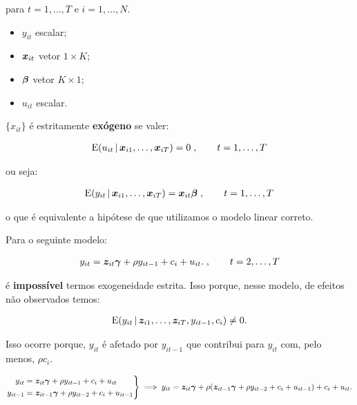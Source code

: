 \documentclass[11pt, oneside, a4paper, article]{article}
\numberwithin{equation}{section}
\begin{document}
\begin{description}
\begin{description}
\noindent
para
$t = 1, \dots, T$ e $i = 1, \dots, N$.

\begin{itemize}\itemsep0pt
\item
$y_{it}$ escalar;

\item
$\boldsymbol{x}_{it}$  vetor $1 \times K$;

\item
$\boldsymbol{\beta}$ vetor $K \times 1$;

\item
$u_{it}$ escalar.
\end{itemize}

\noindent
$\{x_{it}\}$ é estritamente \textbf{exógeno} se valer:

\vspace{-1 em}
\begin{align*}
	\text{E}( u_{it} \, | \, \boldsymbol{x}_{i1}, \dots, \boldsymbol{x}_{iT} ) = 0 \; , \qquad t = 1, \dots, T
\end{align*}

\noindent
ou seja:

\vspace{-1 em}
\begin{align*}
\text{E}( y_{it} \, | \, \boldsymbol{x}_{i1}, \dots, \boldsymbol{x}_{iT} ) = \boldsymbol{x}_{it} \boldsymbol{\beta} 
\; , \qquad t = 1, \dots, T
\end{align*}

\noindent
o que é equivalente a hipótese de que utilizamos o modelo linear correto.

Para o seguinte modelo:

\vspace{-1.5 em}
\begin{align*}
y_{it} = \boldsymbol{z}_{it} \boldsymbol{\gamma} + \rho y_{i t - 1} + c_{i} + u_{it}.
\; , \qquad t = 2, \dots, T
\end{align*}

\noindent
é \textbf{impossível} termos exogeneidade estrita.
Isso porque, nesse modelo, de efeitos não observados temos:

\vspace{-1.5 em}
\begin{align*}
	\text{E}( y_{it} \, | \, \boldsymbol{z}_{i1}, \dots, \boldsymbol{z}_{iT}, y_{it-1}, c_{i}) \neq 0.
\end{align*}

\noindent
Isso ocorre porque, $y_{it}$ é afetado por $y_{it-1}$ que contribui para $y_{it}$ com, pelo menos, $\rho c_{i}$.

\begin{equation*}
\left.
\begin{aligned}
y_{it} &= \boldsymbol{z}_{it} \boldsymbol{\gamma} + \rho y_{i t - 1} + c_{i} + u_{it}
\\
y_{it-1} &= \boldsymbol{z}_{it-1} \boldsymbol{\gamma} + \rho y_{i t - 2} + c_{i} + u_{it-1}
\end{aligned}
\right\} 
\implies
y_{it} = \boldsymbol{z}_{it} \boldsymbol{\gamma} +
\rho (\boldsymbol{z}_{it-1} \boldsymbol{\gamma} + \rho y_{i t - 2} + c_{i} + u_{it-1})
+ c_{i} + u_{it}.
\end{equation*}


\end{description}
\end{description}
\end{document}
